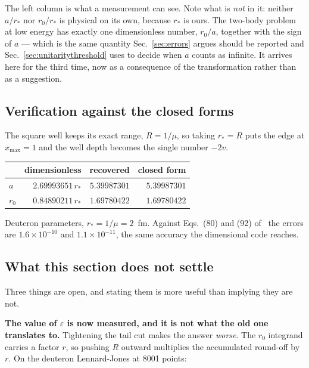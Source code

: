 \documentclass[11pt,a4paper]{article}
\begin{document}
\noindent
The left column is what a measurement can see. Note what is \emph{not} in it:
neither $a/r_*$ nor $r_0/r_*$ is physical on its own, because $r_*$ is ours.
The two-body problem at low energy has exactly one dimensionless number,
$r_0/a$, together with the sign of $a$ --- which is the same quantity
Sec.~\ref{sec:errors} argues should be reported and Sec.~\ref{sec:unitaritythreshold}
uses to decide when $a$ counts as infinite. It arrives here for the third time,
now as a consequence of the transformation rather than as a suggestion.

\subsection{Verification against the closed forms}

The square well keeps its exact range, $R = 1/\mu$, so taking $r_* = R$ puts the
edge at $x_{\max} = 1$ and the well depth becomes the single number $-2v$.

\begin{center}
\small
\begin{tabular}{@{}lrrr@{}}
\toprule
 & dimensionless & recovered & closed form \\
\midrule
$a$ & $2.69993651\,r_*$ & $5.39987301$ & $5.39987301$ \\
$r_0$ & $0.84890211\,r_*$ & $1.69780422$ & $1.69780422$ \\
\bottomrule
\end{tabular}
\end{center}

\noindent
Deuteron parameters, $r_* = 1/\mu = 2$~fm. Against Eqs.~(80) and (92)
of~\cite{rbef} the errors are $1.6\times10^{-10}$ and $1.1\times10^{-11}$,
the same accuracy the dimensional code reaches.

\subsection{What this section does not settle}

Three things are open, and stating them is more useful than implying they are
not.

\textbf{The value of $\varepsilon$ is now measured, and it is not what the old
one translates to.} Tightening the tail cut makes the answer \emph{worse}. The
$r_0$ integrand carries a factor $r$, so pushing $R$ outward multiplies the
accumulated round-off by $r$. On the deuteron Lennard-Jones at 8001 points:
\end{document}
